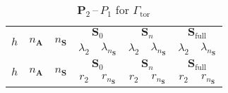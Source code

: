 \documentclass[12pt]{article}
\newcommand{\vect}[1]{\boldsymbol{\mathbf{#1}}}
\newcommand{\tor}{{\Gamma_{\text{tor}}}}
\begin{document}
\begin{table}[h!]
	\centering
	\caption{$\vect P_2$\,--\,$P_1$ for $\tor$} 
	\label{tab:p2p1_tor}
	\small
	\begin{tabular}[1.3]{|c|c|c|c|c|c|c|c|c|}
		\hline
		\multirow{2}{*}{$h$} & \multirow{2}{*}{$n_{\vect A}$} & \multirow{2}{*}{$n_{\vect S}$} & \multicolumn{2}{c|}{$\vect S_0$} & \multicolumn{2}{c|}{$\vect S_n$} & \multicolumn{2}{c|}{$\vect S_{\text{full}}$} \\ 
		\cline{4-9}
		& & & $\lambda_2$ & $\lambda_{n_{\vect S}}$ & $\lambda_2$ & $\lambda_{n_{\vect S}}$ & $\lambda_2$ & $\lambda_{n_{\vect S}}$ \\ 
		\hline
		
		\multirow{2}{*}{$h$} & \multirow{2}{*}{$n_{\vect A}$} & \multirow{2}{*}{$n_{\vect S}$} & \multicolumn{2}{c|}{$\vect S_0$} & \multicolumn{2}{c|}{$\vect S_n$} & \multicolumn{2}{c|}{$\vect S_{\text{full}}$} \\ 
		\cline{4-9}
		& & & $r_2$ & $r_{n_{\vect S}}$ & $r_2$ & $r_{n_{\vect S}}$ & $r_2$ & $r_{n_{\vect S}}$ \\ 
		\hline
		
	\end{tabular}
\end{table}



\end{document}
